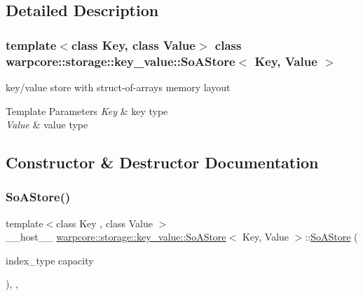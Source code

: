 \subsection{Detailed Description}
\subsubsection*{template$<$class Key, class Value$>$\newline
class warpcore\+::storage\+::key\+\_\+value\+::\+So\+A\+Store$<$ Key, Value $>$}

key/value store with struct-\/of-\/arrays memory layout 


\begin{DoxyTemplParams}{Template Parameters}
{\em Key} & key type \\
\hline
{\em Value} & value type \\
\hline
\end{DoxyTemplParams}


\subsection{Constructor \& Destructor Documentation}
\mbox{\label{classwarpcore_1_1storage_1_1key__value_1_1SoAStore_ada33178712cdc4a96ff1dee1b3a9e624}} 
\subsubsection{\texorpdfstring{So\+A\+Store()}{SoAStore()}\hspace{0.1cm}{\footnotesize\ttfamily [1/3]}}
{\footnotesize\ttfamily template$<$class Key , class Value $>$ \\
\+\_\+\+\_\+host\+\_\+\+\_\+ \hyperlink{classwarpcore_1_1storage_1_1key__value_1_1SoAStore}{warpcore\+::storage\+::key\+\_\+value\+::\+So\+A\+Store}$<$ Key, Value $>$\+::\hyperlink{classwarpcore_1_1storage_1_1key__value_1_1SoAStore}{So\+A\+Store} (\begin{DoxyParamCaption}\item[{index\+\_\+type}]{capacity }\end{DoxyParamCaption})\hspace{0.3cm}{\ttfamily [inline]}, {\ttfamily [explicit]}, {\ttfamily [noexcept]}}



